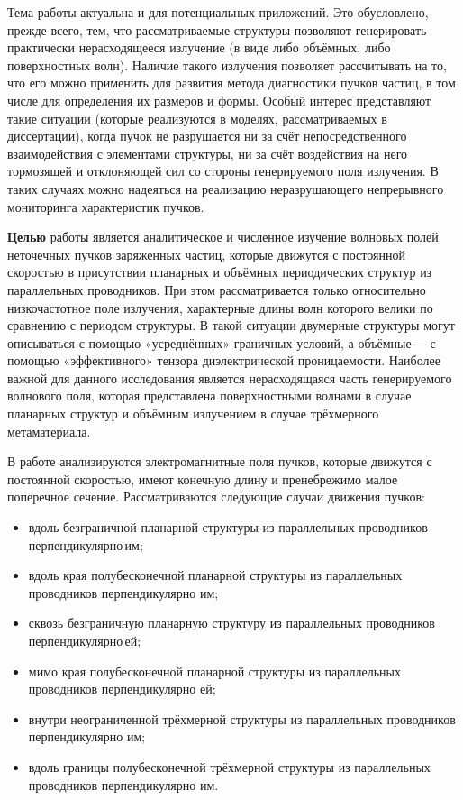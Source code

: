Тема работы актуальна и для потенциальных приложений. Это обусловлено, прежде всего, тем, что рассматриваемые структуры позволяют генерировать практически нерасходящееся излучение (в виде либо объёмных, либо поверхностных волн). Наличие такого излучения позволяет рассчитывать на то, что его можно применить для развития метода диагностики пучков частиц, в том числе для определения их размеров и формы. Особый интерес представляют такие ситуации (которые реализуются в моделях, рассматриваемых в диссертации), когда пучок не разрушается ни за счёт непосредственного взаимодействия с элементами структуры, ни за счёт воздействия на него тормозящей и отклоняющей сил со стороны генерируемого поля излучения. В таких случаях можно надеяться на реализацию неразрушающего непрерывного мониторинга характеристик пучков.

\hfill

\textbf{Целью} работы является аналитическое и численное изучение волновых полей неточечных пучков заряженных частиц, которые движутся с постоянной скоростью в присутствии планарных и объёмных периодических структур из параллельных проводников. При этом рассматривается только относительно низкочастотное поле излучения, характерные длины волн которого велики по сравнению с периодом структуры. В такой ситуации двумерные структуры могут описываться с помощью «усреднённых» граничных условий, а объёмные — с помощью «эффективного» тензора диэлектрической проницаемости. Наиболее важной для данного исследования является нерасходящаяся часть генерируемого волнового поля, которая представлена поверхностными волнами в случае планарных структур и объёмным излучением в случае трёхмерного метаматериала.

В работе анализируются электромагнитные поля пучков, которые движутся с постоянной скоростью, имеют конечную длину и пренебрежимо малое поперечное сечение. Рассматриваются следующие случаи движения пучков:
\begin{itemize}
\item вдоль безграничной планарной структуры из параллельных проводников перпендикулярно им;
\item вдоль края полубесконечной планарной структуры из параллельных проводников перпендикулярно им;
\item сквозь безграничную планарную структуру из параллельных проводников перпендикулярно ей;
\item мимо края полубесконечной планарной структуры из параллельных проводников перпендикулярно ей;
\item внутри неограниченной трёхмерной структуры из параллельных проводников перпендикулярно им;
\item вдоль границы полубесконечной трёхмерной структуры из параллельных проводников перпендикулярно им.
\end{itemize} 

